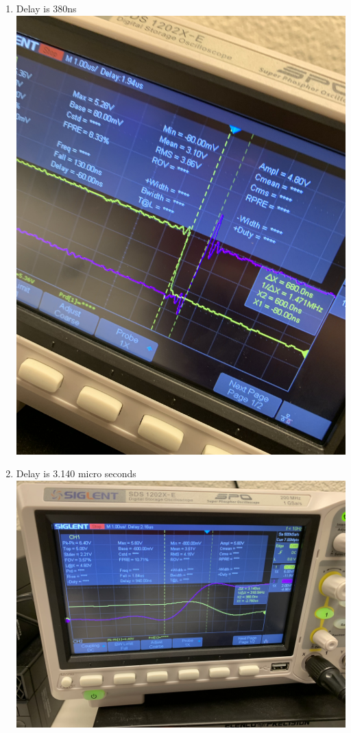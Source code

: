 \documentclass[]{article}
\begin{document}
\begin{enumerate}
	\item Delay is 380ns\\
	\includegraphics[scale=.1,angle=-90]{images/5-1.jpg}\pagebreak
	\item Delay is 3.140 micro seconds\\
	\includegraphics[scale=.1]{images/5-2.jpg}\pagebreak
\end{enumerate}

\end{document}
